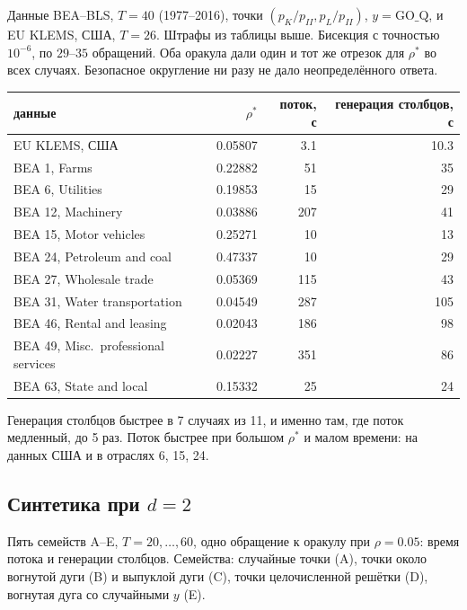 \documentclass[a4paper,11pt]{article}
\theoremstyle{plain}
\theoremstyle{definition}
\theoremstyle{remark}
\begin{document}
Данные BEA--BLS, $T=40$ (1977--2016), точки $(p_K/p_{II},p_L/p_{II})$, $y=\mathrm{GO\_Q}$, и EU KLEMS, США, $T=26$. Штрафы из таблицы выше. Бисекция с точностью $10^{-6}$, по $29$--$35$ обращений. Оба оракула дали один и тот же отрезок для $\rho^*$ во всех случаях. Безопасное округление ни разу не дало неопределённого ответа.
\begin{center}
\begin{tabular}{lrrr}
    \toprule
    данные & $\rho^*$ & поток, с & генерация столбцов, с \\
    \midrule
    EU KLEMS, США & 0.05807 & 3.1 & 10.3 \\
    BEA 1, Farms & 0.22882 & 51 & 35 \\
    BEA 6, Utilities & 0.19853 & 15 & 29 \\
    BEA 12, Machinery & 0.03886 & 207 & 41 \\
    BEA 15, Motor vehicles & 0.25271 & 10 & 13 \\
    BEA 24, Petroleum and coal & 0.47337 & 10 & 29 \\
    BEA 27, Wholesale trade & 0.05369 & 115 & 43 \\
    BEA 31, Water transportation & 0.04549 & 287 & 105 \\
    BEA 46, Rental and leasing & 0.02043 & 186 & 98 \\
    BEA 49, Misc.\ professional services & 0.02227 & 351 & 86 \\
    BEA 63, State and local & 0.15332 & 25 & 24 \\
    \bottomrule
\end{tabular}
\end{center}
Генерация столбцов быстрее в 7 случаях из 11, и именно там, где поток медленный, до 5 раз. Поток быстрее при большом $\rho^*$ и малом времени: на данных США и в отраслях 6, 15, 24.

\subsection{Синтетика при $d=2$}

Пять семейств A--E, $T=20,\dots,60$, одно обращение к оракулу при $\rho=0.05$: время потока и генерации столбцов. Семейства: случайные точки (A), точки около вогнутой дуги (B) и выпуклой дуги (C), точки целочисленной решётки (D), вогнутая дуга со случайными $y$ (E).
\end{document}
